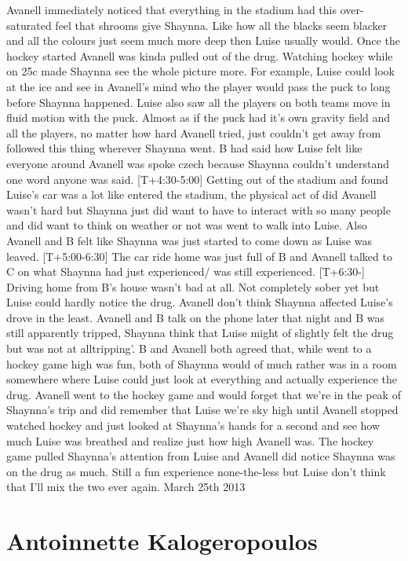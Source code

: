 \documentclass[12pt]{book}
\begin{document}
Avanell immediately noticed that everything in the stadium had this over-saturated feel that shrooms give Shaynna. Like how all the blacks seem blacker and all the colours just seem much more deep then Luise usually would. Once the hockey started Avanell was kinda pulled out of the drug. Watching hockey while on 25c made Shaynna see the whole picture more. For example, Luise could look at the ice and see in Avanell's mind who the player would pass the puck to long before Shaynna happened. Luise also saw all the players on both teams move in fluid motion with the puck. Almost as if the puck had it's own gravity field and all the players, no matter how hard Avanell tried, just couldn't get away from followed this thing wherever Shaynna went. B had said how Luise felt like everyone around Avanell was spoke czech because Shaynna couldn't understand one word anyone was said. [T+4:30-5:00] Getting out of the stadium and found Luise's car was a lot like entered the stadium, the physical act of did Avanell wasn't hard but Shaynna just did want to have to interact with so many people and did want to think on weather or not was went to walk into Luise. Also Avanell and B felt like Shaynna was just started to come down as Luise was leaved. [T+5:00-6:30] The car ride home was just full of B and Avanell talked to C on what Shaynna had just experienced/ was still experienced. [T+6:30-] Driving home from B's house wasn't bad at all. Not completely sober yet but Luise could hardly notice the drug. Avanell don't think Shaynna affected Luise's drove in the least. Avanell and B talk on the phone later that night and B was still apparently tripped, Shaynna think that Luise might of slightly felt the drug but was not at alltripping'. B and Avanell both agreed that, while went to a hockey game high was fun, both of Shaynna would of much rather was in a room somewhere where Luise could just look at everything and actually experience the drug. Avanell went to the hockey game and would forget that we're in the peak of Shaynna's trip and did remember that Luise we're sky high until Avanell stopped watched hockey and just looked at Shaynna's hands for a second and see how much Luise was breathed and realize just how high Avanell was. The hockey game pulled Shaynna's attention from Luise and Avanell did notice Shaynna was on the drug as much. Still a fun experience none-the-less but Luise don't think that I'll mix the two ever again. March 25th 2013



\chapter{Antoinnette Kalogeropoulos}
\end{document}
